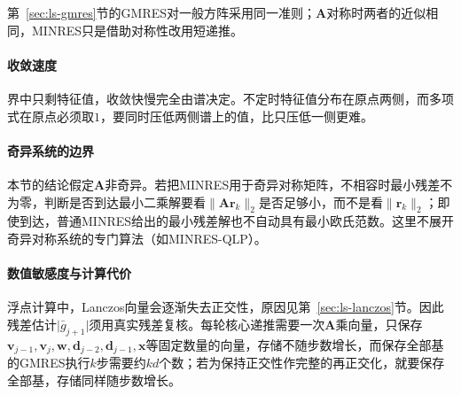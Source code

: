 第~\ref{sec:ls-gmres}节的GMRES对一般方阵采用同一准则；$\bm A$对称时两者的近似相同，MINRES只是借助对称性改用短递推。

\paragraph{收敛速度}
界中只剩特征值，收敛快慢完全由谱决定。不定时特征值分布在原点两侧，而多项式在原点必须取$1$，要同时压低两侧谱上的值，比只压低一侧更难。

\paragraph{奇异系统的边界}
本节的结论假定$\bm A$非奇异。若把MINRES用于奇异对称矩阵，不相容时最小残差不为零，判断是否到达最小二乘解要看$\lVert\bm A\bm r_k\rVert_2$是否足够小，而不是看$\lVert\bm r_k\rVert_2$；即使到达，普通MINRES给出的最小残差解也不自动具有最小欧氏范数。这里不展开奇异对称系统的专门算法（如MINRES-QLP）。

\paragraph{数值敏感度与计算代价}
浮点计算中，Lanczos向量会逐渐失去正交性，原因见第~\ref{sec:ls-lanczos}节。因此残差估计$\lvert\bar g_{j+1}\rvert$须用真实残差复核。每轮核心递推需要一次$\bm A$乘向量，只保存$\bm v_{j-1},\bm v_j,\bm w,\bm d_{j-2},\bm d_{j-1},\bm x$等固定数量的向量，存储不随步数增长，而保存全部基的GMRES执行$k$步需要约$kd$个数；若为保持正交性作完整的再正交化，就要保存全部基，存储同样随步数增长。

